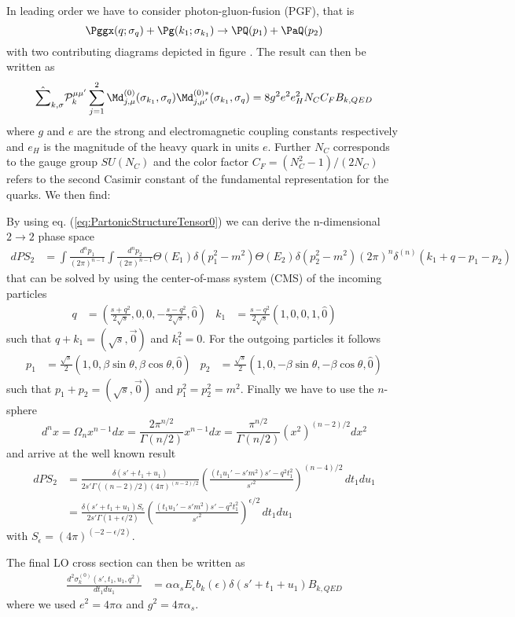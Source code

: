 In leading order we have to consider photon-gluon-fusion (PGF), that is
\begin{equation}
\Pggx(q;\sigma_q) + \Pg(k_1;\sigma_{k_1}) \rightarrow \PQ(p_1)+\PaQ(p_2)
\end{equation}
with two contributing diagrams depicted in figure . The result can then be written as
\begin{equation}
\hat\sum_{k,\sigma}\mathcal P_{k}^{\mu\mu'}\sum_{j=1}^2\Md^{(0)}_{j,\mu}(\sigma_{k_1},\sigma_q)\Md^{(0)*}_{j,\mu'}(\sigma_{k_1},\sigma_q) = 8g^2e^2e_H^2 N_C C_F B_{k,QED}
\end{equation}
where $g$ and $e$ are the strong and electromagnetic coupling constants respectively and $e_H$ is the magnitude of the heavy quark in units $e$. Further $N_C$ corresponds to the gauge group $SU(N_C)$ and the color factor $C_F=(N_C^2-1)/(2N_C)$ refers to the second Casimir constant of the fundamental representation for the quarks. We then find:


By using eq. (\ref{eq:PartonicStructureTensor0}) we can derive the n-dimensional $2\rightarrow 2$ phase space
\begin{align}
dPS_2 &= \int\!\frac{d^{n}p_1}{(2\pi)^{n-1}}\!\int\!\frac{d^{n}p_2}{(2\pi)^{n-1}}\Theta(E_1)\delta(p_1^2-m^2)\Theta(E_2)\delta(p_2^2-m^2)(2\pi)^n\delta^{(n)}(k_1+q-p_1-p_2)
\end{align}
that can be solved by using the center-of-mass system (CMS) of the incoming particles\cite{Bojak:2000eu}
\begin{align}
q &= \left(\frac {s+q^2}{2\sqrt s},0,0,-\frac{s-q^2}{2\sqrt s},\hat 0\right) &
k_1 &= \frac {s-q^2}{2\sqrt s}\left(1,0,0,1,\hat 0\right)
\end{align}
such that $q+k_1=(\sqrt s,\vec 0)$ and $k_1^2 = 0$. For the outgoing particles it follows
\begin{align}
p_1 &= \frac{\sqrt s} 2 \left(1,0,\beta\sin\theta,\beta\cos\theta,\hat 0\right)&
p_2 &= \frac{\sqrt s} 2 \left(1,0,-\beta\sin\theta,-\beta\cos\theta,\hat 0\right)
\end{align}
such that $p_1+p_2 = (\sqrt s,\vec 0)$ and $p_1^2 = p_2^2=m^2$. Finally we have to use the $n$-sphere
\begin{equation}
d^nx = \Omega_n x^{n-1} dx = \frac{2\pi^{n/2}}{\Gamma(n/2)}x^{n-1} dx= \frac{\pi^{n/2}}{\Gamma(n/2)}(x^2)^{(n-2)/2} dx^2
\end{equation}
and arrive at the well known result\cite{Laenen1993162}
\begin{align}
dPS_2 &= \frac {\delta(s'+t_1+u_1)} {2s'\Gamma((n-2)/2)(4\pi)^{(n-2)/2}}\left(\frac{(t_1u_1'-s'm^2)s' - q^2t_1^2}{s'^2}\right)^{(n-4)/2}\,dt_1du_1\\
&= \frac {\delta(s'+t_1+u_1)S_\epsilon} {2s'\Gamma(1+\epsilon/2)}\left(\frac{(t_1u_1'-s'm^2)s' - q^2t_1^2}{s'^2}\right)^{\epsilon/2}\,dt_1du_1
\end{align}
with $S_\epsilon = (4\pi)^{(-2-\epsilon/2)}$.

The final LO cross section can then be written as
\begin{align}
\frac{d^2\sigma_{k}^{(0)}(s',t_1,u_1,q^2)}{dt_1du_1} &= \alpha\alpha_s E_\epsilon b_k(\epsilon)\delta(s'+t_1+u_1) B_{k,QED}
\end{align}
where we used $e^2=4\pi\alpha$ and $g^2=4\pi\alpha_s$.

